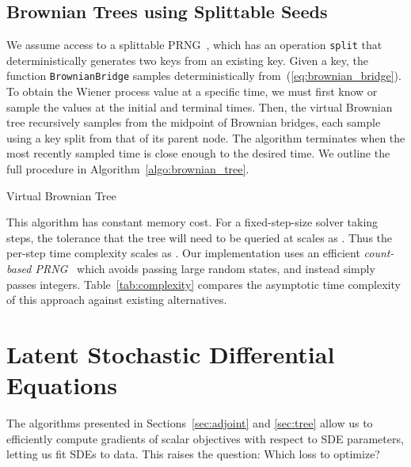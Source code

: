 \documentclass[twoside]{article}
\let\oldReturn\Return
\renewcommand{\Return}{\State\oldReturn}
\begin{document}
\subsection{Brownian Trees using Splittable Seeds}
We assume access to a splittable PRNG~\citep{claessen2013splittable}, which has an operation \texttt{split} that deterministically generates two keys from an existing key.
Given a key, the function \texttt{BrownianBridge} samples deterministically from~(\ref{eq:brownian_bridge}). 
To obtain the Wiener process value at a specific time, we must first know or sample the values at the initial and terminal times.
Then, the virtual Brownian tree recursively samples from the midpoint of Brownian bridges, each sample using a key split from that of its parent node.
The algorithm terminates when the most recently sampled time is close enough to the desired time. 
We outline the full procedure in Algorithm~\ref{algo:brownian_tree}.
\begin{algorithm}[h]
\centering
\caption{Virtual Brownian Tree}
\label{algo:brownian_tree}
\begin{algorithmic}

    \vspace{.75mm}
    \State 
    \State 
    \State  
    \While{}
    \If{} 
    \Else{} 
    \EndIf
    \State 
    \State 
    \State  
    \EndWhile
    \Return{}
\end{algorithmic}
\end{algorithm}
This algorithm has constant memory cost.
For a fixed-step-size solver taking  steps, the tolerance that the tree will need to be queried at scales as .
Thus the per-step time complexity scales as .
Our implementation uses an efficient \textit{count-based PRNG}~\cite{salmon2011parallel} which avoids passing large random states, and instead simply passes integers.
Table~\ref{tab:complexity} compares the asymptotic time complexity of this approach against existing alternatives.





 \section{Latent Stochastic Differential Equations}
The algorithms presented in Sections~\ref{sec:adjoint} and \ref{sec:tree} allow us to efficiently compute gradients of scalar objectives with respect to SDE parameters, letting us fit SDEs to data.
This raises the question: Which loss to optimize?
\end{document}
